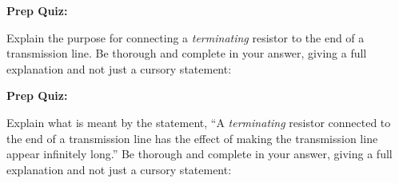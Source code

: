 \vfil \eject

\noindent
{\bf Prep Quiz:}

Explain the purpose for connecting a {\it terminating} resistor to the end of a transmission line.  Be thorough and complete in your answer, giving a full explanation and not just a cursory statement:











\vfil \eject

\noindent
{\bf Prep Quiz:}

Explain what is meant by the statement, ``A {\it terminating} resistor connected to the end of a transmission line has the effect of making the transmission line appear infinitely long.''  Be thorough and complete in your answer, giving a full explanation and not just a cursory statement: 





